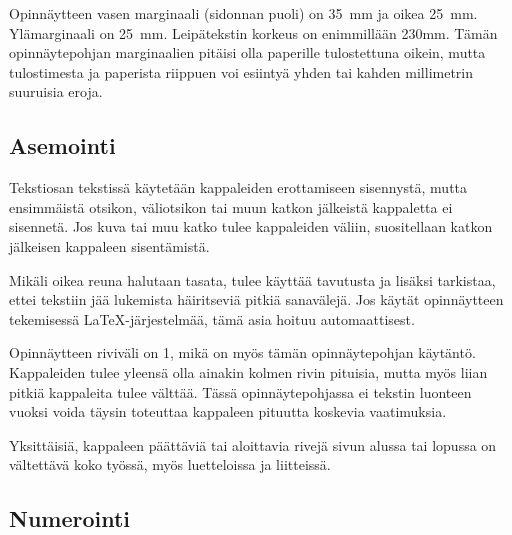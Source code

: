 \documentclass[english,12pt,a4paper,pdftex,elec,utf8]{aaltothesis}
\begin{document}
Opinn\"aytteen vasen marginaali (sidonnan puoli) on
35~mm %
ja oikea 25~mm. Yl\"amarginaali on 25~mm. Leip\"atekstin korkeus on
enimmill\"a\"an 230mm. T\"am\"an opinn\"aytepohjan marginaalien pit\"aisi olla
paperille tulostettuna oikein, mutta tulostimesta ja paperista
riippuen voi esiinty\"a yhden tai kahden millimetrin suuruisia eroja.
\subsection*{Asemointi}

Tekstiosan tekstiss\"a k\"aytet\"a\"an kappaleiden erottamiseen sisennyst\"a,
mutta ensimm\"aist\"a otsikon, v\"aliotsikon tai muun katkon j\"alkeist\"a
kappaletta ei sisennet\"a. Jos kuva tai muu katko tulee kappaleiden
v\"aliin, suositellaan katkon j\"alkeisen kappaleen sisent\"amist\"a.

Mik\"ali oikea reuna halutaan tasata, tulee k\"aytt\"a\"a tavutusta ja lis\"aksi
tarkistaa, ettei tekstiin j\"a\"a lukemista h\"airitsevi\"a pitki\"a sanav\"alej\"a. Jos
k\"ayt\"at opinn\"aytteen tekemisess\"a \LaTeX-j\"arjestelm\"a\"a, 
t\"am\"a asia hoituu automaattisest.

Opinn\"aytteen riviv\"ali on 1, mik\"a on my\"os t\"am\"an opinn\"aytepohjan k\"ayt\"ant\"o. 
Kappaleiden tulee yleens\"a olla ainakin kolmen rivin pituisia, mutta
my\"os liian pitki\"a kappaleita tulee v\"altt\"a\"a.  T\"ass\"a opinn\"aytepohjassa
ei tekstin luonteen vuoksi voida t\"aysin toteuttaa kappaleen pituutta koskevia
vaatimuksia.

Yksitt\"aisi\"a, kappaleen p\"a\"att\"avi\"a tai aloittavia rivej\"a sivun alussa
tai lopussa on v\"altett\"av\"a koko ty\"oss\"a, my\"os luetteloissa ja
liitteiss\"a.

\subsection*{Numerointi}
\end{document}
